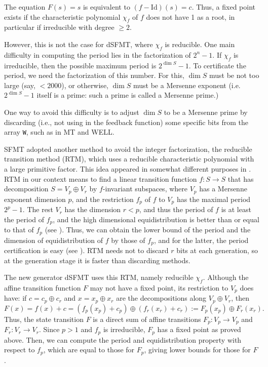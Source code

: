 \documentclass{svmult}
\begin{document}
The equation $F(s)=s$ is equivalent to $(f-\textrm{Id})(s)=c$.
Thus, a fixed point exists 
if the characteristic polynomial $\chi_f$ of $f$ 
does not have 1 as a root, 
in particular if irreducible with degree $\geq 2$.

However, this is not the case for dSFMT, where 
$\chi_f$ is reducible. One main difficulty in 
computing the period lies in the factorization of
$2^n-1$. If $\chi_f$ is irreducible, then the 
possible maximum period is $2^{\dim S}-1$. 
To certificate the period, we need the factorization 
of this number. For this, $\dim S$ must be not too
large (say, $<2000$), or otherwise, $\dim S$ must be a Mersenne
exponent (i.e. $2^{\dim S}-1$ itself is a prime:
such a prime is called a Mersenne prime.)

One way to avoid this difficulty is to adjust $\dim S$
to be a Mersenne prime by discarding (i.e., not using in the feedback function)
some specific bits from the array \texttt{W}, such as in 
MT and WELL\cite{WELL}.
 
SFMT adopted another method to avoid the integer factorization, the
reducible transition method (RTM), which uses a reducible
characteristic polynomial with a large primitive factor.  This idea
appeared in somewhat different purposes in 
\cite{FUSHIMI90}\cite{BRENT}\cite{BRENT-PRIM}.
RTM in our context means to find a linear transition function $f:S \to S$
that has decomposition $S=V_p\oplus V_r$
by $f$-invariant subspaces, where $V_p$ has 
a Mersenne exponent dimension $p$, and the restriction 
$f_p$ of $f$ to $V_p$ has the maximal period $2^p-1$.
The rest $V_r$ has the dimension $r < p$, and thus
the period of $f$ is at least the period of $f_p$,
and the high dimensional equidistribution is 
better than or equal to that of $f_p$ (see \cite{SFMT}).
Thus, we can obtain the lower bound of the period
and the dimension of equidistribution of $f$ by 
those of $f_p$, and for the latter, the period certification
is easy (see \cite[\S3.2.2]{knuth:bible}).
RTM needs not to discard $r$ bits at each generation, 
so at the generation stage it is faster than discarding 
methods. 

The new generator dSFMT uses this RTM, namely reducible $\chi_f$.
Although the affine transition function $F$ may not have
a fixed point, its restriction to $V_p$ does have:
if $c=c_p\oplus c_r$ and $x=x_p\oplus x_r$ are
the decompositions along $V_p\oplus V_r$, then
\begin{equation}\label{eq:decomp-F}
F(x)=f(x)+c=(f_p(x_p)+c_p) \oplus (f_r(x_r)+c_r):=F_p(x_p)\oplus F_r(x_r).
\end{equation}
Thus, the state transition $F$ is a direct sum of affine transitions
$F_p: V_p \to V_p$ and $F_r: V_r \to V_r$. Since $p>1$ and
$f_p$ is irreducible, $F_p$ has a fixed point as proved above.
Then, we can compute the period and equidistribution 
property with respect to $f_p$, which are equal to 
those for $F_p$, giving lower bounds for those for $F$.
\end{document}
